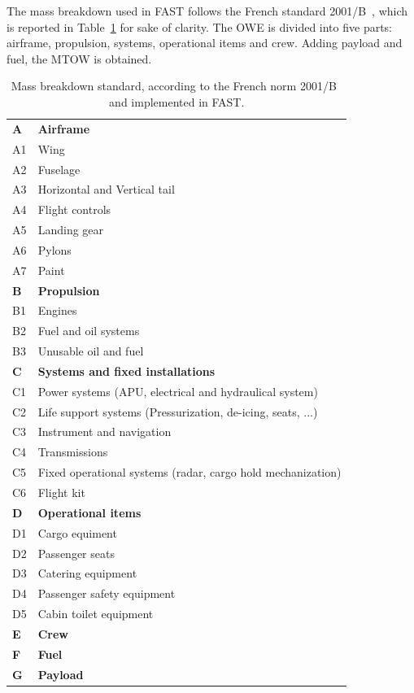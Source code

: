 The mass breakdown used in FAST follows the French standard 2001/B~\cite{bib:mass_breakdown}, which is reported in Table~\ref{tab:mass_breakdown_standard} for sake of clarity. 
The OWE is divided into five parts: airframe, propulsion, systems, operational items and crew.
Adding payload and fuel, the MTOW is obtained. 
\begin{table}[!h]
	\centering
	\begin{tabular}{l l}
		\hline
		\textbf{A} & \textbf{Airframe} \\
		A1 & Wing \\
		A2 & Fuselage \\
		A3 & Horizontal and Vertical tail \\
		A4 & Flight controls \\
		A5 & Landing gear \\
		A6 & Pylons \\
		A7 & Paint \\
		\textbf{B} & \textbf{Propulsion} \\
		B1 & Engines \\
		B2 & Fuel and oil systems \\
		B3 & Unusable oil and fuel \\
		\textbf{C} & \textbf{Systems and fixed installations} \\
		C1 & Power systems (APU, electrical and hydraulical system) \\
		C2 & Life support systems (Pressurization, de-icing, seats, ...) \\
		C3 & Instrument and navigation \\
		C4 & Transmissions \\
		C5 & Fixed operational systems (radar, cargo hold mechanization) \\
		C6 & Flight kit \\
		\textbf{D} & \textbf{Operational items} \\
		D1 & Cargo equiment \\
		D2 & Passenger seats \\
		D3 & Catering equipment \\
		D4 & Passenger safety equipment \\
		D5 & Cabin toilet equipment \\
		\textbf{E} & \textbf{Crew} \\
		\textbf{F} & \textbf{Fuel} \\
		\textbf{G} & \textbf{Payload} \\		
		\hline
	\end{tabular}
	\caption{Mass breakdown standard, according to the French norm 2001/B~\cite{bib:mass_breakdown} and implemented in FAST.}
	\label{tab:mass_breakdown_standard}
\end{table} 

